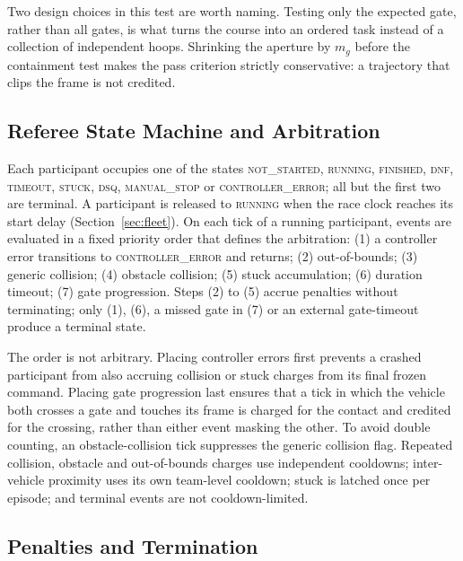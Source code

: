 


Two design choices in this test are worth naming. Testing only the expected gate,
rather than all gates, is what turns the course into an ordered task instead of a
collection of independent hoops. Shrinking the aperture by $m_g$ before the
containment test makes the pass criterion strictly conservative: a trajectory
that clips the frame is not credited.

\subsection{Referee State Machine and Arbitration}

Each participant occupies one of the states \textsc{not\_started},
\textsc{running}, \textsc{finished}, \textsc{dnf}, \textsc{timeout},
\textsc{stuck}, \textsc{dsq}, \textsc{manual\_stop} or
\textsc{controller\_error}; all but the first two are terminal. A participant is
released to \textsc{running} when the race clock reaches its start delay
(Section~\ref{sec:fleet}). On each tick of a running participant, events are
evaluated in a fixed priority order that defines the arbitration: (1) a
controller error transitions to \textsc{controller\_error} and returns;
(2) out-of-bounds; (3) generic collision; (4) obstacle collision; (5) stuck
accumulation; (6) duration timeout; (7) gate progression. Steps (2) to (5) accrue
penalties without terminating; only (1), (6), a missed gate in (7) or an external
gate-timeout produce a terminal state.

The order is not arbitrary. Placing controller errors first prevents a crashed
participant from also accruing collision or stuck charges from its final frozen
command. Placing gate progression last ensures that a tick in which the vehicle
both crosses a gate and touches its frame is charged for the contact and credited
for the crossing, rather than either event masking the other. To avoid double
counting, an obstacle-collision tick suppresses the generic collision flag.
Repeated collision, obstacle and out-of-bounds charges use independent cooldowns;
inter-vehicle proximity uses its own team-level cooldown; stuck is latched once
per episode; and terminal events are not cooldown-limited.

\subsection{Penalties and Termination}

